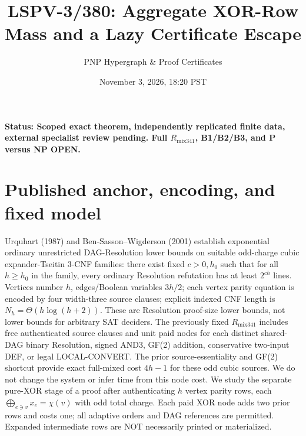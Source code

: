 \documentclass[11pt]{article}
\title{LSPV-3/380: Aggregate XOR-Row Mass and a Lazy Certificate Escape}
\author{PNP Hypergraph \& Proof Certificates}
\date{November 3, 2026, 18:20 PST}
\begin{document}
\maketitle
\noindent\textbf{Status: Scoped exact theorem, independently replicated finite data, external specialist review pending. Full \(R_{\mathrm{mix341}}\), B1/B2/B3, and P versus NP OPEN.}
\section*{Published anchor, encoding, and fixed model}
Urquhart (1987) and Ben-Sasson--Wigderson (2001) establish exponential ordinary unrestricted DAG-Resolution lower bounds on suitable odd-charge cubic expander-Tseitin 3-CNF families: there exist fixed \(c>0,h_0\) such that for all \(h\ge h_0\) in the family, every ordinary Resolution refutation has at least \(2^{ch}\) lines. Vertices number \(h\), edges/Boolean variables \(3h/2\); each vertex parity equation is encoded by four width-three source clauses; explicit indexed CNF length is \(N_h=\Theta(h\log(h+2))\). These are Resolution proof-size lower bounds, not lower bounds for arbitrary SAT deciders. The previously fixed \(R_{\mathrm{mix341}}\) includes free authenticated source clauses and unit paid nodes for each distinct shared-DAG binary Resolution, signed AND3, GF(2) addition, conservative two-input DEF, or legal LOCAL-CONVERT. The prior source-essentiality and GF(2) shortcut provide exact full-mixed cost \(4h-1\) for these odd cubic sources. We do not change the system or infer time from this node cost.
We study the separate pure-XOR stage of a proof after authenticating \(h\) vertex parity rows, each \(\bigoplus_{e\ni v}x_e=\chi(v)\) with odd total charge. Each paid XOR node adds two prior rows and costs one; all adaptive orders and DAG references are permitted. Expanded intermediate rows are NOT necessarily printed or materialized.
\end{document}
